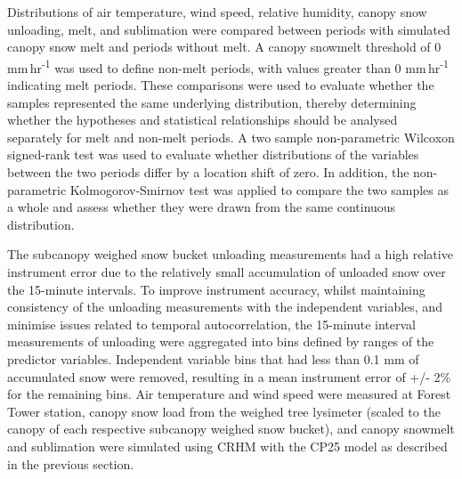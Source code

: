 \documentclass[
  letterpaper,
]{tex/uofsthesis-cs}
\begin{document}
Distributions of air temperature, wind speed, relative humidity, canopy
snow unloading, melt, and sublimation were compared between periods with
simulated canopy snow melt and periods without melt. A canopy snowmelt
threshold of 0 mm\,hr\textsuperscript{-1} was used to define non-melt
periods, with values greater than 0 mm\,hr\textsuperscript{-1}
indicating melt periods. These comparisons were used to evaluate whether
the samples represented the same underlying distribution, thereby
determining whether the hypotheses and statistical relationships should
be analysed separately for melt and non-melt periods. A two sample
non-parametric Wilcoxon signed-rank test was used to evaluate whether
distributions of the variables between the two periods differ by a
location shift of zero. In addition, the non-parametric
Kolmogorov-Smirnov test was applied to compare the two samples as a
whole and assess whether they were drawn from the same continuous
distribution.

The subcanopy weighed snow bucket unloading measurements had a high
relative instrument error due to the relatively small accumulation of
unloaded snow over the 15-minute intervals. To improve instrument
accuracy, whilst maintaining consistency of the unloading measurements
with the independent variables, and minimise issues related to temporal
autocorrelation, the 15-minute interval measurements of unloading were
aggregated into bins defined by ranges of the predictor variables.
Independent variable bins that had less than 0.1 mm of accumulated snow
were removed, resulting in a mean instrument error of +/- 2\% for the
remaining bins. Air temperature and wind speed were measured at Forest
Tower station, canopy snow load from the weighed tree lysimeter (scaled
to the canopy of each respective subcanopy weighed snow bucket), and
canopy snowmelt and sublimation were simulated using CRHM with the CP25
model as described in the previous section.
\end{document}
